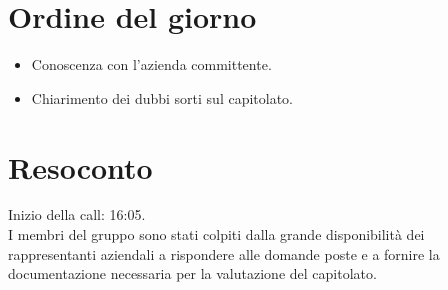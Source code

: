 \section{Ordine del giorno}
\begin{itemize}
    \item Conoscenza con l'azienda committente.
    \item Chiarimento dei dubbi sorti sul capitolato.
\end{itemize}

\section{Resoconto}
Inizio della call: 16:05.\\
I membri del gruppo sono stati colpiti dalla grande disponibilità dei rappresentanti aziendali a 
rispondere alle domande poste e a fornire la documentazione necessaria per la valutazione del capitolato.

